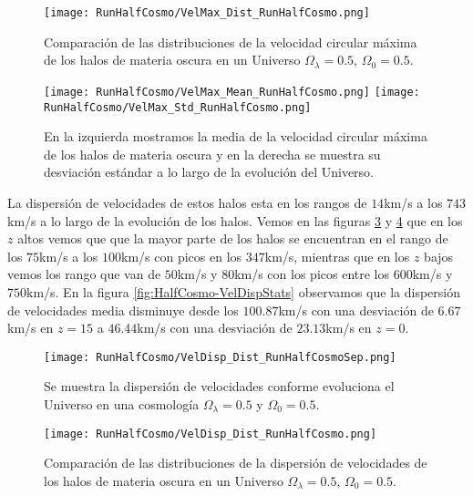 \begin{figure}[H]
    \centering
    \texttt{[image: RunHalfCosmo/VelMax\_Dist\_RunHalfCosmo.png]}
    \caption[Distribución de la velocidad circular máxima]{\footnotesize Comparación de las distribuciones de la velocidad circular máxima de los halos de materia oscura en un Universo $\Omega_\lambda = 0.5 $, $\Omega_0 = 0.5$.}
    \label{fig:HalfCosmo-VelMaxDist}
\end{figure}

\begin{figure}[H]
    \centering
    \texttt{[image: RunHalfCosmo/VelMax\_Mean\_RunHalfCosmo.png]}
    \texttt{[image: RunHalfCosmo/VelMax\_Std\_RunHalfCosmo.png]}
    \caption[Media y desviación estándar de la velocidad circular máxima]{\footnotesize En la izquierda mostramos la media de la velocidad circular máxima de los halos de materia oscura y en la derecha se muestra su desviación estándar a lo largo de la evolución del Universo.}
    \label{fig:HalfCosmo-VelMaxStats}
\end{figure}

La dispersión de velocidades de estos halos esta en los rangos de $14$km/s a los $743$km/s a lo largo de la evolución de los halos. Vemos en las figuras \ref{fig:HalfCosmo-VelDispDistSep} y \ref{fig:HalfCosmo-VelDispDist} que en los $z$ altos vemos que que la mayor parte de los halos se encuentran en el rango de los $75$km/s a los $100$km/s con picos en los $347$km/s, mientras que en los $z$ bajos vemos los rango que van de $50$km/s y $80$km/s con los picos entre los $600$km/s y $750$km/s. En la figura \ref{fig:HalfCosmo-VelDispStats} observamos que la dispersión de velocidades media disminuye desde los $100.87$km/s con una desviación de $6.67$km/s en $z=15$ a $46.44$km/s con una desviación de $23.13$km/s en $z=0$.

\begin{figure}[H]
    \centering
    \texttt{[image: RunHalfCosmo/VelDisp\_Dist\_RunHalfCosmoSep.png]}
    \caption[Dispersión de velocidades]{\footnotesize Se muestra la dispersión de velocidades conforme evoluciona el Universo en una cosmología $\Omega_\lambda = 0.5 $ y $\Omega_0 = 0.5$.}
    \label{fig:HalfCosmo-VelDispDistSep}
\end{figure}

\begin{figure}[H]
    \centering
    \texttt{[image: RunHalfCosmo/VelDisp\_Dist\_RunHalfCosmo.png]}
    \caption[Distribución de la dispersión de velocidades]{\footnotesize Comparación de las distribuciones de la dispersión de velocidades de los halos de materia oscura en un Universo $\Omega_\lambda = 0.5 $, $\Omega_0 = 0.5$.}
    \label{fig:HalfCosmo-VelDispDist}
\end{figure}

